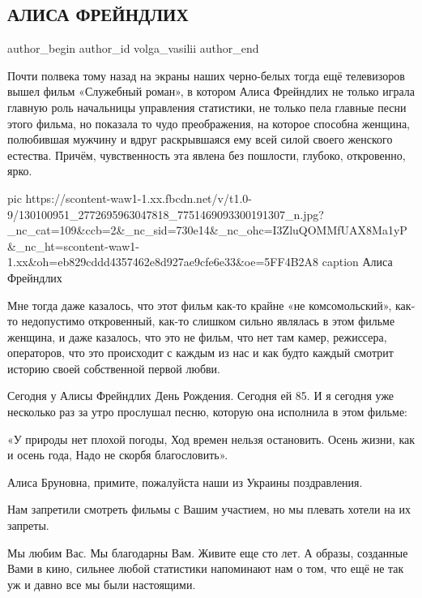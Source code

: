  
 
 
 
 
 
\subsection{АЛИСА ФРЕЙНДЛИХ}
\label{sec:08_12_2020.fb.volga_vasilii.1.alisa_freindlich}
\ifcmt
	author_begin
   author_id volga_vasilii
	author_end
\fi
{}

Почти полвека тому назад на экраны наших черно-белых тогда ещё телевизоров
вышел фильм «Служебный роман», в котором Алиса Фрейндлих не только играла
главную роль начальницы управления статистики, не только пела главные песни
этого фильма, но показала то чудо преображения, на которое способна женщина,
полюбившая мужчину и вдруг раскрывшаяся ему всей силой своего женского
естества. Причём, чувственность эта явлена без пошлости, глубоко, откровенно,
ярко.

\ifcmt
pic https://scontent-waw1-1.xx.fbcdn.net/v/t1.0-9/130100951_2772695963047818_7751469093300191307_n.jpg?_nc_cat=109&ccb=2&_nc_sid=730e14&_nc_ohc=I3ZluQOMMfUAX8Ma1yP&_nc_ht=scontent-waw1-1.xx&oh=eb829cddd4357462e8d927ae9cfe6e33&oe=5FF4B2A8
caption Алиса Фрейндлих
\fi

Мне тогда даже казалось, что этот фильм как-то крайне «не комсомольский»,
как-то недопустимо откровенный, как-то слишком сильно являлась в этом фильме
женщина, и даже казалось, что это не фильм, что нет там камер, режиссера,
операторов, что это происходит с каждым из нас и как будто каждый смотрит
историю своей собственной первой любви.

Сегодня у Алисы Фрейндлих День Рождения.  Сегодня ей 85. И я сегодня уже
несколько раз за утро прослушал песню, которую она исполнила в этом фильме:

\begingroup
\obeycr\noindent\large\color{blue}
«У природы нет плохой погоды,
Ход времен нельзя остановить.
Осень жизни, как и осень года,
Надо не скорбя благословить».
\restorecr
\endgroup

Алиса Бруновна, примите, пожалуйста наши из Украины поздравления.

Нам запретили смотреть фильмы с Вашим участием, но мы плевать хотели на их запреты.

Мы любим Вас. Мы благодарны Вам. Живите еще сто лет. А образы, созданные Вами в
кино, сильнее любой статистики напоминают нам о том, что ещё не так уж и давно
все мы были настоящими.
